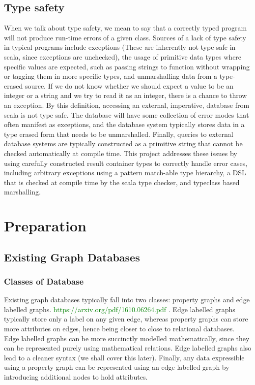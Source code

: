 \documentclass[12pt,a4paper,twoside,openright]{report}
\newcommand\toReference[1]{\textcolor{green}{#1}}
\begin{document}
\section{Type safety}
When we talk about type safety, we mean to say that a correctly typed program will not produce run-time errors of a given class. Sources of a lack of  type safety in typical programs include exceptions (These are inherently not type safe in scala, since exceptions are unchecked), the usage of primitive data types where specific values are expected, such as passing strings to function without wrapping or tagging them in more specific types, and unmarshalling data from a type-erased source. If we do not know whether we should expect a value to be an integer or a string and we try to read it as an integer, there is a chance to throw an exception. 
By this definition, accessing an external, imperative, database from scala is not type safe. The database will have some collection of error modes that often manifest as exceptions, and the database system typically stores data in a type erased form that needs to be unmarshalled. Finally, queries to external database systems are typically constructed as a primitive string that cannot be checked automatically at compile time. This project addresses these issues by using carefully constructed result container types to correctly handle error cases, including arbitrary exceptions using a pattern match-able type hierarchy, a DSL that is checked at compile time by the scala type checker, and typeclass based marshalling.

\chapter{Preparation}

\section{Existing Graph Databases}
\subsection{Classes of Database}
Existing graph databases typically fall into two classes: property graphs and edge labelled graphs. \toReference{https://arxiv.org/pdf/1610.06264.pdf} . Edge labelled graphs typically store only a label on any given edge, whereas property graphs can store more attributes on edges, hence being closer to close to relational databases. Edge labelled graphs can be more succinctly modelled mathematically, since they can be represented purely using mathematical relations. Edge labelled graphs also lead to a cleaner syntax (we shall cover this later). Finally, any data expressible using a property graph can be represented using an edge labelled graph by introducing additional nodes to hold attributes.
\end{document}
